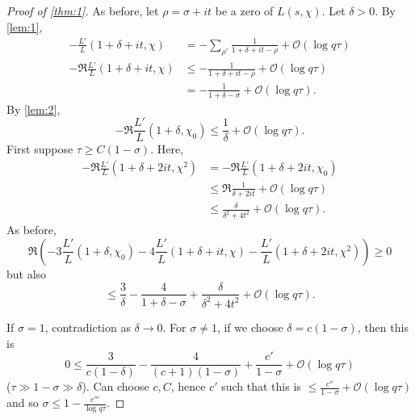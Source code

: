 \documentclass{article}
\newcommand{\1}{\mathbbm{1}}
\newcommand{\bigO}{\mathcal{O}}
\begin{document}
\begin{proof}[Proof of \cref{thm:1}]
  \newlec
  As before, let $\rho = \sigma + it$ be a zero of $L(s,\chi)$. Let $\delta  > 0$.
  By \cref{lem:1},
  \begin{align*}
    -\frac{L'}{L}(1+\delta+it, \chi) &= - \sum_{\rho'} \frac{1}{1+\delta+it-\rho} + \bigO(\log q \tau) \\
    -\Re\frac{L'}{L}(1+\delta+it, \chi) &\leq - \frac{1}{1+\delta+it-\rho} + \bigO(\log q \tau) \\
                                        &= -\frac{1}{1+\delta-\sigma} + \bigO(\log q \tau).
  \end{align*}
  By \cref{lem:2},
  \begin{equation*}
    -\Re \frac{L'}{L}(1+\delta,\chi_0) \leq \frac{1}{\delta} + \bigO(\log q\tau).
  \end{equation*}
  First suppose $\tau \geq C(1-\sigma)$. Here,
  \begin{align*}
    -\Re\frac{L'}{L}(1+\delta+2it,\chi^2) &= -\Re\frac{L'}{L}(1+\delta+2it,\chi_0) \\
                                          &\leq \Re \frac{1}{\delta+2it} + \bigO(\log q\tau) \\
                                          &\leq \frac{\delta}{\delta^2 + 4t^2} + \bigO(\log q\tau).
  \end{align*}
  As before,
  \begin{equation*}
    \Re\left(-3\frac{L'}{L}(1+\delta,\chi_0) - 4\frac{L'}{L}(1+\delta+it,\chi) - \frac{L'}{L}(1+\delta+2it, \chi^2)\right) \geq 0
  \end{equation*}
  but also
  \begin{equation*}
    \leq \frac{3}{\delta} - \frac{4}{1+\delta-\sigma} + \frac{\delta}{\delta^2+4t^2} + \bigO(\log q\tau).
  \end{equation*}

  If $\sigma = 1$, contradiction as $\delta \to 0$.
  For $\sigma \neq 1$, if we choose $\delta = c(1-\sigma)$, then this is
  \begin{equation*}
    0 \leq \frac{3}{c(1-\delta)} - \frac{4}{(c+1)(1-\sigma)} + \frac{c'}{1-\sigma} + \bigO(\log q \tau)
  \end{equation*}
  ($\tau \gg 1-\sigma \gg \delta$).
  Can choose $c,C$, hence $c'$ such that this is $\leq \frac{c''}{1-\sigma} + \bigO(\log q \tau)$ and so $\sigma \leq 1- \frac{c'''}{\log q\tau}.$


\end{proof}
\end{document}
